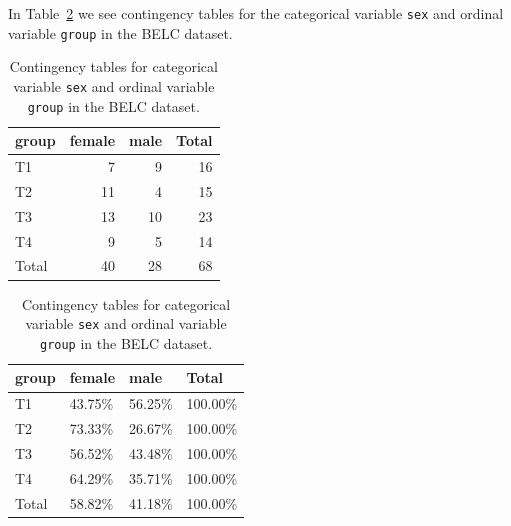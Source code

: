 \documentclass[
  letterpaper,
  DIV=11,
  numbers=noendperiod]{scrreport}
\theoremstyle{definition}
\theoremstyle{remark}
\begin{document}
In Table~\ref{tbl-aa-belc-contingency-tables} we see contingency tables
for the categorical variable \texttt{sex} and ordinal variable
\texttt{group} in the BELC dataset.

\begin{table}

\caption{\label{tbl-aa-belc-contingency-tables}Contingency tables for
categorical variable \texttt{sex} and ordinal variable \texttt{group} in
the BELC dataset.}\begin{minipage}[t]{0.50\linewidth}

{\centering 

\tabularnewline

\centering
\begin{tabular}{l|r|r|r}
\hline
group & female & male & Total\\
\hline
T1 & 7 & 9 & 16\\
\hline
T2 & 11 & 4 & 15\\
\hline
T3 & 13 & 10 & 23\\
\hline
T4 & 9 & 5 & 14\\
\hline
Total & 40 & 28 & 68\\
\hline
\end{tabular}

}

\end{minipage}%
%
\begin{minipage}[t]{0.50\linewidth}

{\centering 

\tabularnewline

\centering
\begin{tabular}{l|l|l|l}
\hline
group & female & male & Total\\
\hline
T1 & 43.75\% & 56.25\% & 100.00\%\\
\hline
T2 & 73.33\% & 26.67\% & 100.00\%\\
\hline
T3 & 56.52\% & 43.48\% & 100.00\%\\
\hline
T4 & 64.29\% & 35.71\% & 100.00\%\\
\hline
Total & 58.82\% & 41.18\% & 100.00\%\\
\hline
\end{tabular}

}

\end{minipage}%

\end{table}
\end{document}
